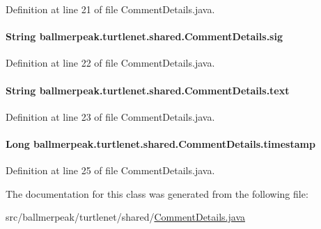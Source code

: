 Definition at line 21 of file Comment\-Details.\-java.

\hypertarget{classballmerpeak_1_1turtlenet_1_1shared_1_1CommentDetails_a6512dd32f4aab495d61c7592e8e38583}{
\paragraph[{sig}]{\setlength{\rightskip}{0pt plus 5cm}String ballmerpeak.\-turtlenet.\-shared.\-Comment\-Details.\-sig}}\label{classballmerpeak_1_1turtlenet_1_1shared_1_1CommentDetails_a6512dd32f4aab495d61c7592e8e38583}


Definition at line 22 of file Comment\-Details.\-java.

\hypertarget{classballmerpeak_1_1turtlenet_1_1shared_1_1CommentDetails_a4aa59661e2b3ef7c1a3d25e38c53d7bf}{
\paragraph[{text}]{\setlength{\rightskip}{0pt plus 5cm}String ballmerpeak.\-turtlenet.\-shared.\-Comment\-Details.\-text}}\label{classballmerpeak_1_1turtlenet_1_1shared_1_1CommentDetails_a4aa59661e2b3ef7c1a3d25e38c53d7bf}


Definition at line 23 of file Comment\-Details.\-java.

\hypertarget{classballmerpeak_1_1turtlenet_1_1shared_1_1CommentDetails_a8ac94ee627e504421f05caf66e592aff}{
\paragraph[{timestamp}]{\setlength{\rightskip}{0pt plus 5cm}Long ballmerpeak.\-turtlenet.\-shared.\-Comment\-Details.\-timestamp}}\label{classballmerpeak_1_1turtlenet_1_1shared_1_1CommentDetails_a8ac94ee627e504421f05caf66e592aff}


Definition at line 25 of file Comment\-Details.\-java.



The documentation for this class was generated from the following file\-:\begin{DoxyCompactItemize}
\item 
src/ballmerpeak/turtlenet/shared/\hyperlink{CommentDetails_8java}{Comment\-Details.\-java}\end{DoxyCompactItemize}
